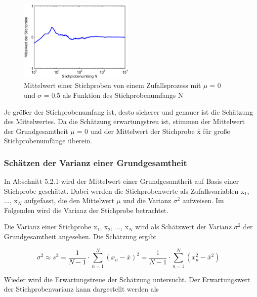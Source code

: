 \noindent 
\begin{figure}[H]
  \centerline{\includegraphics[width=0.5\textwidth]{Kapitel5/Bilder/image4}}
  \caption{Mittelwert einer Stichproben von einem Zufallsprozess mit $\mu$ = 0 und $\sigma$ = 0.5 als Funktion des Stichprobenumfangs N}
  \label{fig:StichprobeMittelwertStandardabweichungStichprobenumfang1}
\end{figure}

\noindent Je gr\"{o}{\ss}er der Stichprobenumfang ist, desto sicherer und genauer ist die Sch\"{a}tzung des Mittelwertes. Da die Sch\"{a}tzung erwartungstreu ist, stimmen der Mittelwert der Grundgesamtheit $\mu$ = 0 und der Mittelwert der Stichprobe $\overline{\mathrm{x}}$ f\"{u}r gro{\ss}e Stichprobenumf\"{a}nge \"{u}berein.

\subsubsection{Sch\"{a}tzen der Varianz einer Grundgesamtheit}

\noindent In Abschnitt 5.2.1 wird der Mittelwert einer Grundgesamtheit auf Basis einer Stichprobe gesch\"{a}tzt. Dabei werden die Stichprobenwerte als Zufallsvariablen x$_{1}$, ..., x$_{N}$ aufgefasst, die den Mittelwert $\mu$ und die Varianz $\sigma^{2}$ aufweisen. Im Folgenden wird die Varianz der Stichprobe betrachtet. 

\noindent Die Varianz einer Stichprobe x$_{1}$, x$_{2}$, ..., x$_{N}$ wird als Sch\"{a}tzwert der Varianz $\sigma^{2}$ der Grundgesamtheit angesehen. Die Sch\"{a}tzung ergibt

\begin{equation}\label{eq:fiveleven}
\sigma ^{2} \approx s^{2} =\dfrac{1}{N-1} \cdot \sum _{n=1}^{N}\left(x_{n} -\bar{x}\right)^{2}  =\dfrac{1}{N-1} \cdot \sum _{n=1}^{N}\left(x_{n}^{2} -\bar{x}^{2} \right)
\end{equation}

\noindent Wieder wird die Erwartungstreue der Sch\"{a}tzung untersucht. Der Erwartungswert der Stichprobenvarianz kann dargestellt werden als

